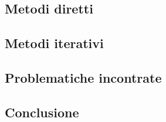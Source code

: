 \documentclass[11pt,a4paper]{scrartcl}
\begin{document}
\subsection*{Metodi diretti}

\subsection*{Metodi iterativi}

\subsection*{Problematiche incontrate}

\subsection*{Conclusione}
\end{document}
